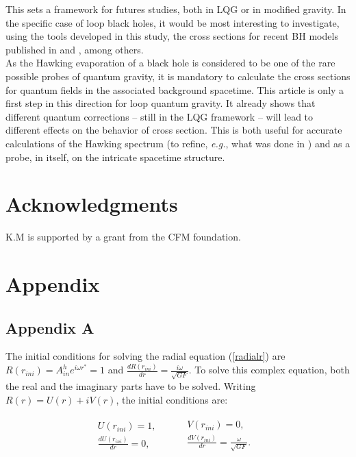 \documentclass[twocolumn,amsmath,amssymb,prl,10pt,nofootinbib,superscriptaddress]{revtex4}
\begin{document}
This sets a framework for futures studies, both in LQG or in modified gravity. In the specific case of loop black holes, it would be most interesting to investigate, using the tools developed in this study, the cross sections for recent BH models published in \cite{BenAchour:2018khr} and \cite{Ashtekar:2018lag,Ashtekar:2018cay}, among others.\\

As the Hawking evaporation of a black hole is considered to be one of the rare possible probes of quantum gravity, it is mandatory to calculate the cross sections for quantum fields in the associated background spacetime. This article is only a first step in this direction for loop quantum gravity. It already shows that different quantum corrections -- still in the LQG framework -- will lead to different effects on the behavior of cross section. This is both useful for accurate calculations of the Hawking spectrum (to refine, {\it e.g.}, what was done in \cite{Barrau:2015ana}) and as a probe, in itself, on the intricate spacetime structure. 

\section{Acknowledgments}

K.M is supported by a grant from the CFM foundation.




\section{Appendix}


\subsection{Appendix A}

The initial conditions for solving the radial equation (\ref{radialr}) are $R(r_{ini})= A^h_{in}e^{i \omega r^*}=1$ and $\frac{dR(r_{ini})}{dr}=\frac{i \omega}{\sqrt{GF}}$. To solve this complex equation, both the real and the imaginary parts have to be solved. Writing $R(r)=U(r)+ i V(r)$, the initial conditions are: 


 \begin{align}
  \begin{aligned}
U(r_{ini})=1, & \\ \frac{dU(r_{ini})}{dr}=0,
  \end{aligned}
  &&
  \begin{aligned}
  V(r_{ini})=0,  &   \\  \frac{dV(r_{ini})}{dr}=\frac{\omega}{\sqrt{GF}}.
   \label{cond}
  \end{aligned}  
 \end{align}
\end{document}
